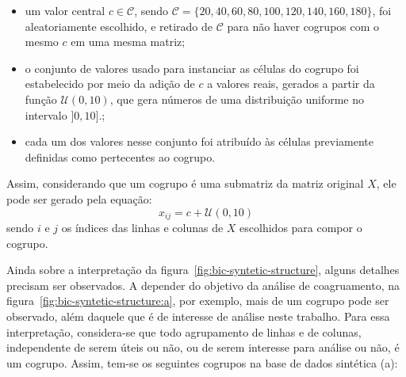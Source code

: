 \documentclass[
    12pt,                %
    oneside,            %
    a4paper,            %
    english,            %
    brazil                %
    ]{abntex2ppgsi}
\begin{document}

\begin{itemize}
    \item um valor central $c \in \mathcal{C}$, sendo $\mathcal{C} = \{ 20, 40, 60, 80, 100, 120, 140, 160, 180 \}$, foi aleatoriamente escolhido, e retirado de $\mathcal{C}$ para não haver cogrupos com o mesmo $c$ em uma mesma matriz;
    \item o conjunto de valores usado para instanciar as células do cogrupo foi estabelecido por meio da adição de $c$ a valores reais, gerados a partir da função $\mathcal{U}(0, 10)$, que gera números de uma distribuição uniforme no intervalo $]0, 10]$.;
    \item cada um dos valores nesse conjunto foi atribuído às células previamente definidas como pertecentes ao cogrupo.
\end{itemize}

Assim, considerando que um cogrupo é uma submatriz da matriz original $X$, ele pode ser gerado pela equação:
\[
    x_{ij} = c + \mathcal{U}(0, 10)
\]
sendo $i$ e $j$ os índices das linhas e colunas de $X$ escolhidos para compor o cogrupo.

Ainda sobre a interpretação da figura~\ref{fig:bic-syntetic-structure}, alguns detalhes precisam ser observados.
A depender do objetivo da análise de coagruamento, na figura~\ref{fig:bic-syntetic-structure:a}, por exemplo, mais de um cogrupo pode ser observado, além daquele que é de interesse de análise neste trabalho.
Para essa interpretação, considera-se que todo agrupamento de linhas e de colunas, independente de serem úteis ou não, ou de serem interesse para análise ou não, é um cogrupo.
Assim, tem-se os seguintes cogrupos na base de dados sintética (a):
\end{document}
